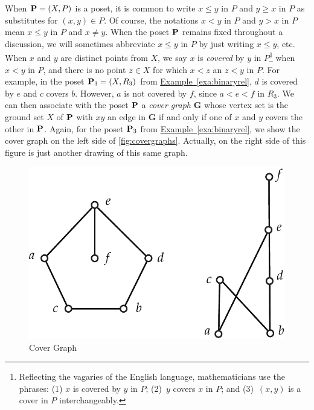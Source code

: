 When $\mathbf{P}=(X,P)$ is a poset, it is common to write $x\le y$ in $P$ and
$y\ge x$ in $P$ as substitutes for $(x,y)\in P$. Of course, the notations $x<y$ in
$P$ and $y>x$ in $P$ mean $x\le y$ in $P$ and $x\ne y$.  When the
poset $\mathbf{P}$ remains fixed throughout a discussion, we will sometimes
abbreviate $x\le y$ in $P$ by just writing $x\le y$, etc.  When $x$
and $y$ are distinct points from $X$, we say $x$ is \textit{covered}
by $y$ in $P$\footnote{Reflecting the vagaries of the English
  language, mathematicians use the phrases: (1) $x$ is covered by $y$
  in $P$; (2)~$y$ covers $x$ in $P$; and (3)~$(x,y)$ is a cover in $P$
  interchangeably.}  when $x<y$ in $P$, and there is no point $z\in X$
for which $x<z$ an $z<y$ in $P$.  For example, in the poset
$\mathbf{P}_3=(X,R_3)$ from
\hyperref[exa:binaryrel]{Example~\ref*{exa:binaryrel}}, $d$ is covered
by $e$ and $c$ covers $b$. However, $a$ is not covered by $f$, since
$a<e<f$ in $R_3$.  We can then associate with the poset $\mathbf{P}$ a
\textit{cover graph} $\mathbf{G}$ whose vertex set is the ground set
$X$ of $\mathbf{P}$ with $xy$ an edge in $\mathbf{G}$ if and only if one of
$x$ and $y$ covers the other in $\mathbf{P}$.  Again, for the poset $\mathbf{P}_3$
from \hyperref[exa:binaryrel]{Example~\ref*{exa:binaryrel}}, we show
the cover graph on the left side of \autoref{fig:covergraphs}.
Actually, on the right side of this figure is just another drawing of
this same graph.

\begin{figure}
\begin{center}
\includegraphics*[scale=.4]{posets-figs/covergraphs.pdf}
\caption{Cover Graph}
\label{fig:covergraphs}
\end{center}
\end{figure}

